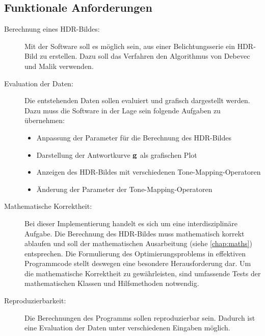 \subsection{Funktionale Anforderungen}
\label{fa}
\begin{description}
\item[Berechnung eines HDR-Bildes:] Mit der Software soll es möglich sein, aus einer Belichtungsserie ein \gls{HDR}-Bild zu erstellen. Dazu soll das Verfahren den Algorithmus von Debevec und Malik verwenden.

\item[Evaluation der Daten:] Die entstehenden Daten sollen evaluiert und grafisch dargestellt werden. Dazu muss die Software in der Lage sein folgende Aufgaben zu übernehmen: 
    \begin{itemize}
        \item Anpassung der Parameter für die Berechnung des \gls{HDR}-Bildes
        \item Darstellung der Antwortkurve $\mathbf g$ als grafischen Plot
        \item Anzeigen des \gls{HDR}-Bildes mit verschiedenen \gls{Tone-Mapping}-Operatoren
        \item Änderung der Parameter der \gls{Tone-Mapping}-Operatoren
    \end{itemize}
    
\item[Mathematische Korrektheit:] Bei dieser Implementierung handelt es sich um eine interdisziplinäre Aufgabe. Die Berechnung des \gls{HDR}-Bildes muss mathematisch korrekt ablaufen und soll der mathematischen Ausarbeitung (siehe \autoref{chap:maths}) entsprechen. Die Formulierung des Optimierungsproblems in effektiven Programmcode stellt deswegen eine besondere Herausforderung dar. Um die mathematische Korrektheit zu gewährleisten, sind umfassende Tests der mathematischen Klassen und Hilfsmethoden notwendig.

\item[Reproduzierbarkeit:] Die Berechnungen des Programms sollen reproduzierbar sein. Dadurch ist eine Evaluation der Daten unter verschiedenen Eingaben möglich.

\end{description}


